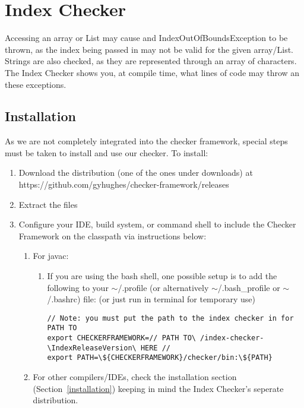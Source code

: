 \chapter{Index Checker\label{index-checker}}

Accessing an array or List may cause and IndexOutOfBoundsException to be thrown, as the index
being passed in may not be valid for the given array/List. Strings are also checked, as they
are represented through an array of characters.
The Index Checker shows you, at compile time, what lines of code may throw an these exceptions.

\section{Installation\label{index-install}}

As we are not completely integrated into the checker framework, special steps must be taken to
install and use our checker. To install:

\begin{enumerate}
\item Download the distribution (one of the ones under downloads) at
https://github.com/gyhughes/checker-framework/releases
\item Extract the files
\item Configure your IDE, build system, or command shell to include the
Checker Framework on the classpath via instructions below:
\begin{enumerate}
\item For javac:
\begin{enumerate}
\item If you are using the bash shell, one possible setup is to add the following
to your $\sim$/.profile (or alternatively $\sim$/.bash\_profile or $\sim$/.bashrc) file:
(or just run in terminal for temporary use)

\begin{Verbatim}
// Note: you must put the path to the index checker in for PATH TO
export CHECKERFRAMEWORK=// PATH TO\ /index-checker-\IndexReleaseVersion\ HERE //
export PATH=\${CHECKERFRAMEWORK}/checker/bin:\${PATH}
\end{Verbatim}

\end{enumerate}
\item For other compilers/IDEs, check the installation section
(Section~\ref{installation}) keeping in mind the
Index Checker's seperate distribution.
\end{enumerate}
\end{enumerate}

